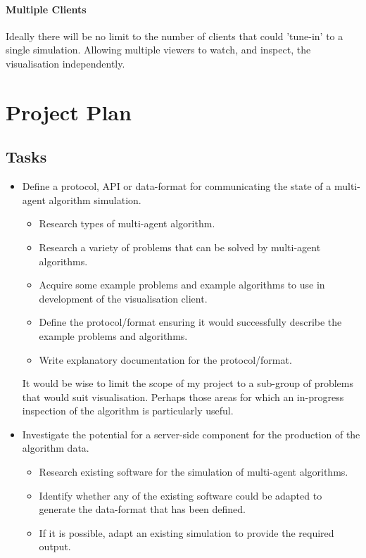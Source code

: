 \documentclass[a4paper]{article}
\begin{document}
		\paragraph{Multiple Clients} Ideally there will be no limit to the number of clients that could 'tune-in' to a single simulation. Allowing multiple viewers to watch, and inspect, the visualisation independently.

	\section{Project Plan}

		\subsection{Tasks}

			\begin{itemize}

				\item Define a protocol, \textsc{API} or data-format for communicating the state of a multi-agent algorithm simulation.

					\begin{itemize}

						\item Research types of multi-agent algorithm.
						\item Research a variety of problems that can be solved by multi-agent algorithms.
						\item Acquire some example problems and example algorithms to use in development of the visualisation client.
						\item Define the protocol/format ensuring it would successfully describe the example problems and algorithms.
						\item Write explanatory documentation for the protocol/format.

					\end{itemize}

					It would be wise to limit the scope of my project to a sub-group of problems that would suit visualisation. Perhaps those areas for which an in-progress inspection of the algorithm is particularly useful.

				\item Investigate the potential for a server-side component for the production of the algorithm data.

					\begin{itemize}

						\item Research existing software for the simulation of multi-agent algorithms.
						\item Identify whether any of the existing software could be adapted to generate the data-format that has been defined.
						\item If it is possible, adapt an existing simulation to provide the required output.


\end{itemize}
\end{itemize}
\end{document}

